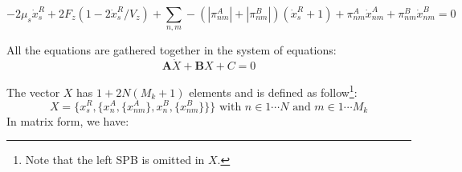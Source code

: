 \documentclass[a4paper,12pt]{article}
\begin{document}
\begin{equation}
  \label{eq:spindle_term}
  - 2\mu_s\dot{x}^R_s + 2F_{z}\left(1 - 2\dot{x}^R_s/V_z\right)%
  + \sum_{n,m}- (|\pi_{nm}^A|  + |\pi_{nm}^B|)(\dot{x}^R_s + 1)%
  + \pi_{nm}^A \dot{x}_{nm}^A + \pi_{nm}^B \dot{x}_{nm}^B= 0%
\end{equation}

All the equations are gathered together in the system of equations:
$$
\mathbf{A}\dot{X} + \mathbf{B}X + C = 0
$$

The vector $X$ has $1 + 2N(M_k + 1)$ elements and is defined as
follow\footnote{Note that the left SPB is omitted in $X$.}:
\begin{equation*}
  X = \{x_s^R, \{x_n^A, \{x_{nm}^A\},  x_n^B,%
  \{x_{nm}^B \}\}\}\mbox{ with } n \in 1 \cdots N %
  \mbox{ and } m \in 1 \cdots M_k
\end{equation*}
In matrix form, we have:\\
\end{document}
